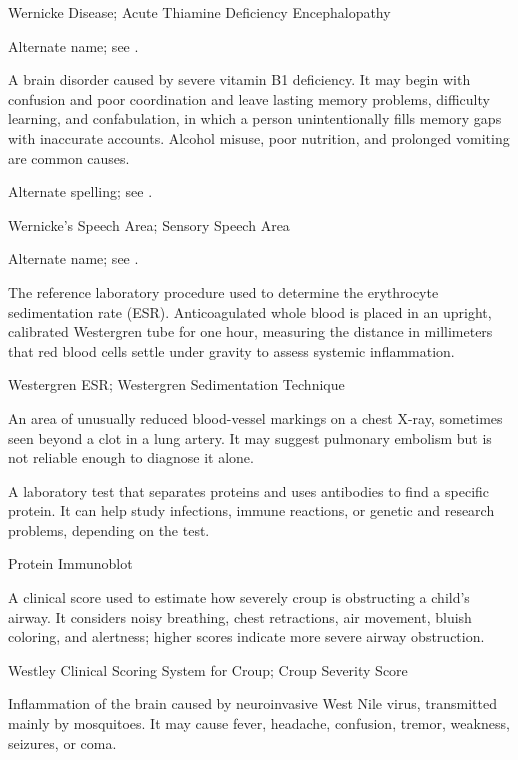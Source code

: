 \synonyms
Wernicke Disease; Acute Thiamine Deficiency Encephalopathy

 Alternate name; see .

 A brain disorder caused by severe vitamin B1 deficiency. It may begin with confusion and poor coordination and leave lasting memory problems, difficulty learning, and confabulation, in which a person unintentionally fills memory gaps with inaccurate accounts. Alcohol misuse, poor nutrition, and prolonged vomiting are common causes.

 Alternate spelling; see .

\synonyms
Wernicke's Speech Area; Sensory Speech Area

 Alternate name; see .

 The reference laboratory procedure used to determine the erythrocyte sedimentation rate (ESR). Anticoagulated whole blood is placed in an upright, calibrated Westergren tube for one hour, measuring the distance in millimeters that red blood cells settle under gravity to assess systemic inflammation.

\synonyms
Westergren ESR; Westergren Sedimentation Technique

 An area of unusually reduced blood-vessel markings on a chest X-ray, sometimes seen beyond a clot in a lung artery. It may suggest pulmonary embolism but is not reliable enough to diagnose it alone.

 A laboratory test that separates proteins and uses antibodies to find a specific protein. It can help study infections, immune reactions, or genetic and research problems, depending on the test.

\synonyms
Protein Immunoblot

 A clinical score used to estimate how severely croup is obstructing a child's airway. It considers noisy breathing, chest retractions, air movement, bluish coloring, and alertness; higher scores indicate more severe airway obstruction.

\synonyms
Westley Clinical Scoring System for Croup; Croup Severity Score

 Inflammation of the brain caused by neuroinvasive West Nile virus, transmitted mainly by mosquitoes. It may cause fever, headache, confusion, tremor, weakness, seizures, or coma.

